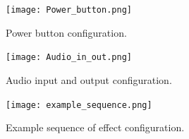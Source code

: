 \documentclass{article}
\begin{document}
\begin{figure}[h]
    \centering
    \texttt{[image: Power\_button.png]}
    \caption{Power button configuration.}
    \label{fig:power_button}
\end{figure}

\begin{figure}[h]
    \centering
    \texttt{[image: Audio\_in\_out.png]}
    \caption{Audio input and output configuration.}
    \label{fig:audio_in_out}
\end{figure}

\begin{figure}[h]
    \centering
    \texttt{[image: example\_sequence.png]}
    \caption{Example sequence of effect configuration.}
    \label{fig:example_sequence}
\end{figure}



\end{document}
